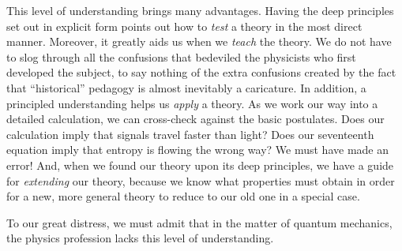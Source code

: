 \documentclass[aps,pra,superscriptaddress,12pt,tightenlines,nofootinbib]{revtex4-2}
\begin{document}
This level of understanding brings many advantages.  Having the deep principles set out in explicit form points out how to {\it test\/} a theory in the most direct manner.  Moreover, it greatly aids us when we {\it teach\/} the theory.  We do not have to slog through all the confusions that bedeviled the physicists who first developed the subject, to say nothing of the extra confusions created by the fact that ``historical'' pedagogy is almost inevitably a caricature.  In addition, a principled understanding helps us {\it apply\/} a theory.  As we work our way into a detailed calculation, we can cross-check against the basic postulates.  Does our calculation imply that signals travel faster than light?  Does our seventeenth equation imply that entropy is flowing the wrong way?  We must have made an error!  And, when we found our theory upon its deep principles, we have a guide for {\it extending\/} our theory, because we know what properties must obtain in order for a new, more general theory to reduce to our old one in a special case.

To our great distress, we must admit that in the matter of quantum mechanics, the physics profession lacks this level of understanding.
\end{document}
